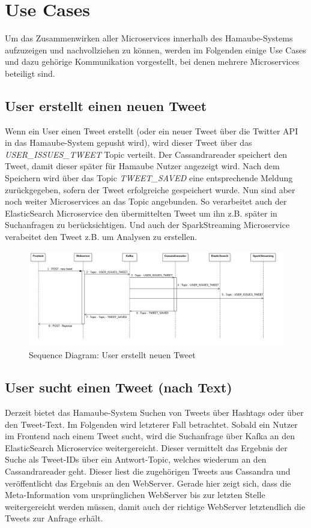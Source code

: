 \section{Use Cases}
\label{Use Cases}
Um das Zusammenwirken aller Microservices innerhalb des Hamaube-Systems aufzuzeigen und nachvollziehen zu können, werden im Folgenden einige Use Cases und dazu gehörige Kommunikation vorgestellt, bei denen mehrere Microservices beteiligt sind.

\subsection{User erstellt einen neuen Tweet}
Wenn ein User einen Tweet erstellt (oder ein neuer Tweet über die Twitter API in das Hamaube-System gepusht wird),
wird dieser Tweet über das \textit{USER\_ISSUES\_TWEET} Topic verteilt.
Der Cassandrareader speichert den Tweet, damit dieser später für Hamaube Nutzer angezeigt wird. Nach dem Speichern wird über das Topic \textit{TWEET\_SAVED} eine entsprechende Meldung zurückgegeben, sofern der Tweet erfolgreiche gespeichert wurde.
Nun sind aber noch weiter Microservices an das Topic angebunden. So verarbeitet auch der ElasticSearch Microservice den übermittelten Tweet um ihn z.B. später in Suchanfragen zu berücksichtigen. Und auch der SparkStreaming Microservice verabeitet den Tweet z.B. um Analysen zu erstellen.

\begin{figure}[htbp!]
	\centering
	\includegraphics[width=\textwidth]{pics/useCases/IssueTweet}
	\caption{Sequence Diagram: User erstellt neuen Tweet}
\end{figure}

\subsection{User sucht einen Tweet (nach Text)}
Derzeit bietet das Hamaube-System Suchen von Tweets über Hashtags oder über den Tweet-Text.
Im Folgenden wird letzterer Fall betrachtet.
Sobald ein Nutzer im Frontend nach einem Tweet sucht, wird die Suchanfrage über Kafka an den ElasticSearch Microservice weitergereicht. Dieser vermittelt das Ergebnis der Suche als Tweet-IDs über ein Antwort-Topic, welches wiederum an den Cassandrareader geht.
Dieser liest die zugehörigen Tweets aus Cassandra und veröffentlicht das Ergebnis an den WebServer.
Gerade hier zeigt sich, dass die Meta-Information vom ursprünglichen WebServer bis zur letzten Stelle weitergereicht werden müssen, damit auch der richtige WebServer letztendlich die Tweets zur Anfrage erhält.


